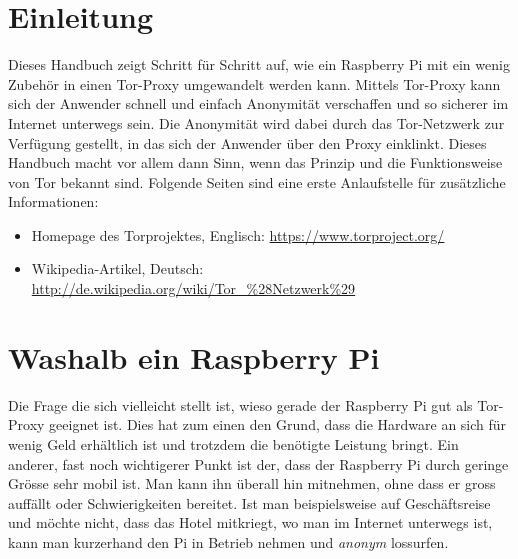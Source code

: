 \section{Einleitung}
Dieses Handbuch zeigt Schritt für Schritt auf, wie ein Raspberry Pi mit ein wenig Zubehör in einen Tor-Proxy umgewandelt werden kann. Mittels Tor-Proxy kann sich der Anwender schnell und einfach Anonymität verschaffen und so sicherer im Internet unterwegs sein.  Die Anonymität wird dabei durch das Tor-Netzwerk zur Verfügung gestellt, in das sich der Anwender über den Proxy einklinkt. Dieses Handbuch macht vor allem dann Sinn, wenn das Prinzip und die Funktionsweise von Tor bekannt sind. Folgende Seiten sind eine erste Anlaufstelle für zusätzliche Informationen: 
\begin{itemize}
\item Homepage des Torprojektes, Englisch: \url{https://www.torproject.org/}
\item Wikipedia-Artikel, Deutsch: \url{http://de.wikipedia.org/wiki/Tor_\%28Netzwerk\%29}
\end{itemize}



\section{Washalb ein Raspberry Pi}
Die Frage die sich vielleicht stellt ist, wieso gerade der Raspberry Pi gut als Tor-Proxy geeignet ist. Dies hat zum einen den Grund, dass die Hardware an sich für wenig Geld erhältlich ist und trotzdem die benötigte Leistung bringt. Ein anderer, fast noch wichtigerer Punkt ist der, dass der Raspberry Pi durch geringe Grösse sehr mobil ist. Man kann ihn überall hin mitnehmen, ohne dass er gross auffällt oder Schwierigkeiten bereitet. Ist man beispielsweise auf Geschäftsreise und möchte nicht, dass das Hotel mitkriegt, wo man im Internet unterwegs ist, kann man kurzerhand den Pi in Betrieb nehmen und \textit{anonym} lossurfen.
